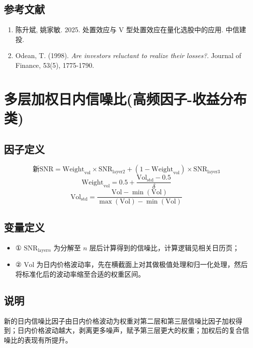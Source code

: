\documentclass{article}
\begin{document}
\subsection{参考文献}
\begin{enumerate}
    \item 陈升斌, 姚家敏. 2025. 处置效应与 V 型处置效应在量化选股中的应用. 中信建投.
    \item Odean, T. (1998). \textit{Are investors reluctant to realize their losses?}. Journal of Finance, 53(5), 1775-1790.
\end{enumerate}

\section{多层加权日内信噪比(高频因子-收益分布类)}

\subsection{因子定义}
\begin{equation}
    \text{新}\mathrm{SNR} = \mathrm{Weight}_{\mathrm{vol}} \times \mathrm{SNR}_{\mathrm{layer2}} + (1 - \mathrm{Weight}_{\mathrm{vol}}) \times \mathrm{SNR}_{\mathrm{layer3}}
\end{equation}
\begin{equation}
    \mathrm{Weight}_{\mathrm{vol}} = 0.5 + \frac{\mathrm{Vol}_{\mathrm{std}} - 0.5}{\delta}
\end{equation}
\begin{equation}
    \mathrm{Vol}_{\mathrm{std}} = \frac{\mathrm{Vol} - \min(\mathrm{Vol})}{\max(\mathrm{Vol}) - \min(\mathrm{Vol})}
\end{equation}

\subsection{变量定义}
\begin{itemize}
    \item ① \( \mathrm{SNR}_{\mathrm{layer}n} \) 为分解至 \( n \) 层后计算得到的信噪比，计算逻辑见相关日历页；
    \item ② \( \mathrm{Vol} \) 为日内价格波动率，先在横截面上对其做极值处理和归一化处理，然后将标准化后的波动率缩至合适的权重区间。
\end{itemize}

\subsection{说明}
新的日内信噪比因子由日内价格波动为权重对第二层和第三层信噪比因子加权得到；日内价格波动越大，剥离更多噪声，赋予第三层更大的权重；加权后的复合信噪比的表现有所提升。
\end{document}
